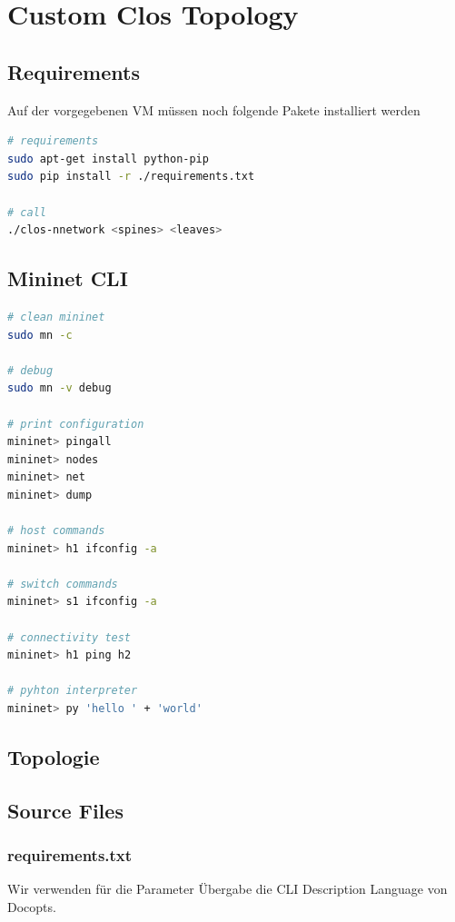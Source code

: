 

\newcommand{\SUBJECT}{Report}
\newcommand{\TITLE}{Cloud Infrastructre Lab 7}



\section{Custom Clos Topology}
\subsection{Requirements}
Auf der vorgegebenen VM müssen noch folgende Pakete installiert werden
\begin{lstlisting}[language=bash]
# requirements
sudo apt-get install python-pip
sudo pip install -r ./requirements.txt

# call
./clos-nnetwork <spines> <leaves>
\end{lstlisting}

\subsection{Mininet CLI}
\begin{lstlisting}[language=bash]
# clean mininet
sudo mn -c

# debug
sudo mn -v debug

# print configuration
mininet> pingall
mininet> nodes
mininet> net
mininet> dump

# host commands
mininet> h1 ifconfig -a

# switch commands
mininet> s1 ifconfig -a

# connectivity test
mininet> h1 ping h2

# pyhton interpreter
mininet> py 'hello ' + 'world'
\end{lstlisting}

\subsection{Topologie}

\subsection{Source Files}
\subsubsection{requirements.txt}
Wir verwenden für die Parameter Übergabe die CLI Description Language von Docopts. 


